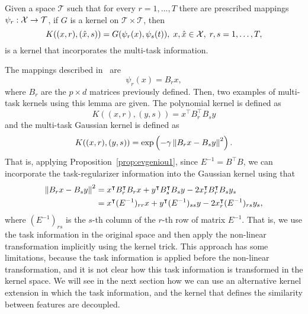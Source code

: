 \begin{lemma}\label{lemma:evgeniou_2}
    Given a space $\mathcal{T}$ such that for every $r=1, \ldots, T$  there are prescribed mappings
    $\psi_r: \mathcal{X} \to \mathcal{T}$, if $G$ is a kernel on $\mathcal{T} \times \mathcal{T}$, then
    \begin{equation}
        \label{eq:evgeniou_lemma2}
        K((x, r), (\hat{x}, s)) = G(\psi_r(x), \psi_s(t)),\; x, \hat{x} \in \Xspace,\; r,s = 1, \ldots, \ntasks ,
    \end{equation}
    is a kernel that incorporates the multi-task information.
\end{lemma}
The mappings described in~\cite{EvgeniouMP05} are
$$ \psi_r(x) = B_r x ,$$
where $B_r$ are the $p \times d$ matrices previously defined.
Then, two examples of multi-task kernels using this lemma are given. The polynomial kernel is defined as
$$ K((x, r), (y, s)) = x^\intercal B_r^\intercal B_s y $$
and the multi-task Gaussian kernel is defined as
$$ K((x, r), (y, s)) = \exp\left(-\gamma \left\lVert B_r x - B_s y\right\rVert^2 \right) .$$
That is, applying Proposition~\ref{prop:evgeniou1}, since $E^{-1} = B^\intercal B$, we can incorporate the task-regularizer information into the Gaussian kernel using that
\begin{align*}
    \left\lVert B_r x - B_s y\right\rVert^2
     & = x^\intercal B_r^\intercal B_r x + y^\intercal B_s^\intercal B_s y - 2 x_r^\intercal B_r^\intercal B_s y_s \\
     & = x^\intercal (E^{-1})_{rr} x + y^\intercal (E^{-1})_{ss} y - 2 x_r^\intercal (E^{-1})_{rs} y_s ,
\end{align*}
where $(E^{-1})_{rs}$ is the $s$-th column of the $r$-th row of matrix $E^{-1}$.
That is, we use the task information in the original space and then apply the non-linear transformation implicitly using the kernel trick.
%
This approach has some limitations, because the task information is applied before the non-linear transformation, and it is not clear how this task information is transformed in the kernel space.
We will see in the next section how we can use an alternative kernel extension in which the task information, and the kernel that defines the similarity between features are decoupled.


